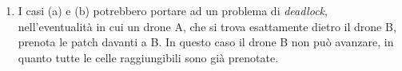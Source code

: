 \begin{enumerate} [label=(\alph*)]
\begin{figure}[H]
\begin{center}
        \end{center}
        \caption{Caso di sovrapposizione dello scheduling delle patch.}
        \label{overlapping_b}
    \end{figure}
    \item I casi (a) e (b) potrebbero portare ad un problema di \textit{deadlock}, nell'eventualità in cui un drone A, che si trova esattamente dietro il drone B, prenota le patch davanti a B.
    In questo caso il drone B non può avanzare, in quanto tutte le celle raggiungibili sono già prenotate.
    \begin{figure}[H] 
        \captionsetup{justification=centering, margin=2cm, font=footnotesize}
        \begin{center}

\end{center}
\end{figure}
\end{enumerate}
